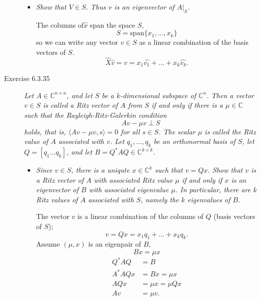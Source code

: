 \documentclass[10pt]{article}
\begin{document}
\begin{description}
\begin{itemize}[\textbf{Part }\bfseries a)]
    \item \emph{Show that $V \in S$.  Thus $v$ is an eigenvector of $A|_S$.}

    The columns of$\hat{x}$ span the space $S$,
    \begin{equation}
        S = \mathrm{span}\{x_1, \ldots , x_k\}
    \end{equation}
    so we can write any vector $v \in S$ as a linear combination of the basis vectors of $S$.
    \begin{equation}
        \hat{X}\hat{v} = v = x_1\hat{v_1}+\ldots+x_k\hat{v_k}.
    \end{equation}

    \end{itemize}

    \item[Exercise 6.3.35] \emph{Let $A \in \mathbb{C}^{n\times n}$, and let $S$ be a $k$-dimensional subspace of $\mathbb{C}^n$.  Then a vector $v \in S$ is called a {\em Ritz vector} of $A$ from $S$ if and only if there is a $\mu \in \mathbb{C}$ such that the {\em Rayleigh-Ritz-Galerkin} condition}
    \begin{equation}
        Av - \mu v \perp S
    \end{equation}
    \emph{holds, that is, $\langle Av - \mu v,s\rangle = 0$ for all $s \in S$.  The scalar $\mu$ is called the {\em Ritz value} of $A$ associated with $v$. Let $q_1, \ldots , q_k$ be an orthonormal basis of $S$, let $Q = [q_1 \ldots q_k]$, and let $B = Q^*AQ \in \mathbb{C}^{k\times k}$.}

    \begin{itemize}[\textbf{Part }\bfseries a)]
    \item \emph{Since $v \in S$, there is a uniqute $x \in \mathbb{C}^k$ such that $v = Qx$.  Show that $v$ is a Ritz vector of $A$ with associated Ritz value $\mu$ if and only if $x$ is an eigenvector of $B$ with associated eigenvalue $\mu$.  In particular, there are $k$ Ritz values of $A$ associated with $S$, namely the $k$ eigenvalues of $B$.}

    The vector $v$ is a linear combination of the columns of $Q$ (basis vectors of $S$);
    \begin{equation}
        v = Qx = x_1q_1+ \ldots +x_kq_k.
    \end{equation}
    Assume $(\mu,x)$ is an eigenpair of $B$,
    \begin{equation}
        Bx = \mu x
    \end{equation}
    \begin{subequations}\begin{align}
        Q^*AQ &= B \\
        A^*AQx &= Bx = \mu x \\
        AQx &= \mu x = \mu Qx \\
        Av &= \mu v.
    \end{align}\end{subequations}


\end{itemize}
\end{description}
\end{document}
